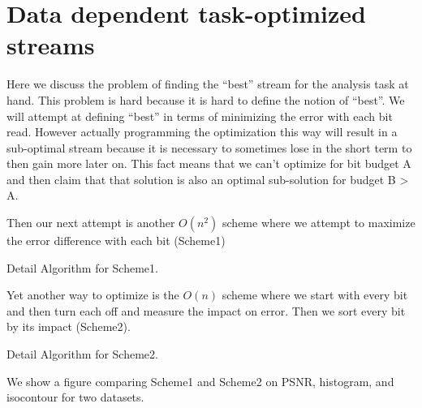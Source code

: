 \section{Data dependent task-optimized streams}

Here we discuss the problem of finding the ``best'' stream for the analysis task at hand. This problem is hard because it is hard to define the notion of ``best''. We will attempt at defining ``best'' in terms of minimizing the error with each bit read. However actually programming the optimization this way will result in a sub-optimal stream because it is necessary to sometimes lose in the short term to then gain more later on. This fact means that we can't optimize for bit budget A and then claim that that solution is also an optimal sub-solution for budget B > A.

Then our next attempt is another $O(n^2)$ scheme where we attempt to maximize the error difference with each bit (Scheme1)

Detail Algorithm for Scheme1.

Yet another way to optimize is the $O(n)$ scheme where we start with every bit and then turn each off and measure the impact on error. Then we sort every bit by its impact (Scheme2).

Detail Algorithm for Scheme2.

We show a figure comparing Scheme1 and Scheme2 on PSNR, histogram, and isocontour for two datasets.
